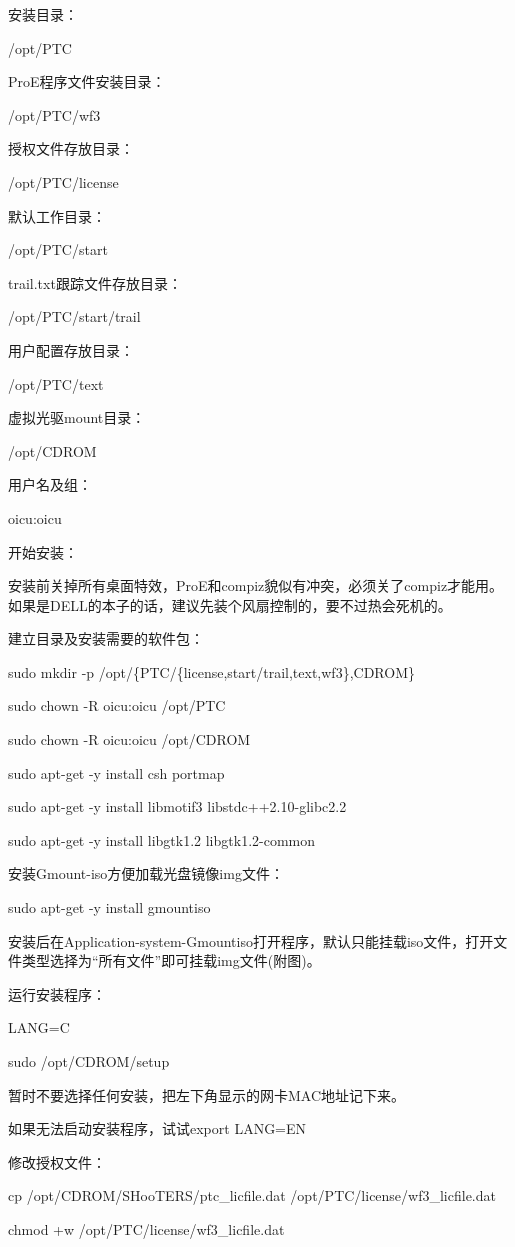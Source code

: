 安装目录：

/opt/PTC

ProE程序文件安装目录：

/opt/PTC/wf3

授权文件存放目录：

/opt/PTC/license

默认工作目录：

/opt/PTC/start

trail.txt跟踪文件存放目录：

/opt/PTC/start/trail

用户配置存放目录：

/opt/PTC/text

虚拟光驱mount目录：

/opt/CDROM

用户名及组：

oicu:oicu

开始安装：

安装前关掉所有桌面特效，ProE和compiz貌似有冲突，必须关了compiz才能用。如果是DELL的本子的话，建议先装个风扇控制的，要不过热会死机的。

建立目录及安装需要的软件包：

sudo mkdir -p /opt/\{PTC/\{license,start/trail,text,wf3\},CDROM\}

sudo chown -R oicu:oicu /opt/PTC

sudo chown -R oicu:oicu /opt/CDROM

sudo apt-get -y install csh portmap

sudo apt-get -y install libmotif3 libstdc++2.10-glibc2.2

sudo apt-get -y install libgtk1.2 libgtk1.2-common

安装Gmount-iso方便加载光盘镜像img文件：

sudo apt-get -y install gmountiso

安装后在Application-system-Gmountiso打开程序，默认只能挂载iso文件，打开文件类型选择为“所有文件”即可挂载img文件(附图)。

运行安装程序：

LANG=C

sudo /opt/CDROM/setup

暂时不要选择任何安装，把左下角显示的网卡MAC地址记下来。

如果无法启动安装程序，试试export LANG=EN

修改授权文件：

cp /opt/CDROM/SHooTERS/ptc\_licfile.dat /opt/PTC/license/wf3\_licfile.dat

chmod +w /opt/PTC/license/wf3\_licfile.dat

